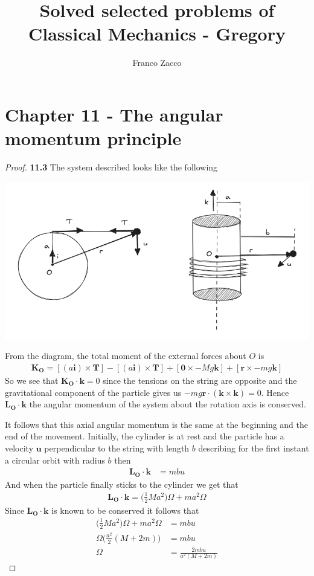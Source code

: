 \documentclass[11pt]{article}
\title{\textbf{Solved selected problems of Classical Mechanics - Gregory}}
\author{Franco Zacco}
\date{}
\theoremstyle{definition}
\begin{document}
\maketitle
\thispagestyle{empty}

\section*{Chapter 11 - The angular momentum principle}

	\begin{proof}{\textbf{11.3}}
    The system described looks like the following
    \begin{center}
        \includegraphics[scale=0.55]{ch11-3.png}
    \end{center}
    From the diagram, the total moment of the external forces about $O$ is
    \begin{align*}
        \bm{K_O} = [(a\bm{i}) \times \bm{T}] - [(a\bm{i}) \times \bm{T}]
        + [\bm{0} \times -Mg\bm{k}] + [\bm{r} \times -mg\bm{k}]
    \end{align*}
    So we see that $\bm{K_O} \cdot \bm{k} = 0$ since the tensions on the string
    are opposite and the gravitational component of the particle gives us
    $-mg\bm{r} \cdot (\bm{k} \times \bm{k}) = 0$. Hence $\bm{L_O} \cdot \bm{k}$
    the angular momentum of the system about the rotation axis is conserved.

    It follows that this axial angular momentum is the same at the beginning
    and the end of the movement.
    Initially, the cylinder is at rest and the particle has a velocity $\bm{u}$
    perpendicular to the string with length $b$ describing for the first
    instant a circular orbit with radius $b$ then
    \begin{align*}
        \bm{L_O} \cdot \bm{k} &= mbu
    \end{align*}
    And when the particle finally sticks to the cylinder we get that
    \begin{align*}
        \bm{L_O} \cdot \bm{k} = \bigg(\frac{1}{2}Ma^2\bigg)\Omega +  ma^2\Omega
    \end{align*}
    Since $\bm{L_O} \cdot \bm{k}$ is known to be conserved it follows that
    \begin{align*}
        \bigg(\frac{1}{2}Ma^2\bigg)\Omega +  ma^2\Omega &= mbu\\
        \Omega\bigg(\frac{a^2}{2}(M + 2m)\bigg) &= mbu\\
        \Omega &= \frac{2mbu}{a^2(M+2m)}
    \end{align*}
    \end{proof}
\end{document}
